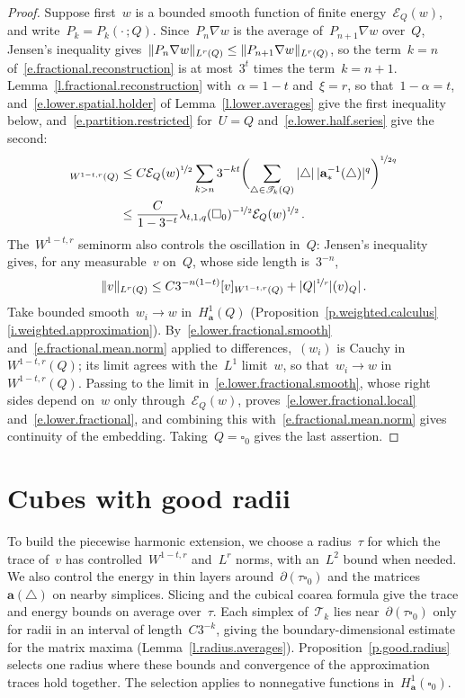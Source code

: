 \documentclass[11pt,letterpaper]{article}
\numberwithin{equation}{section}
\theoremstyle{definition}
\renewcommand{\a}{\mathbf{a}}
\newcommand{\nf}{\nicefrac}
\newcommand{\cu}{\square}
\DeclarePairedDelimiter{\norm}{\lVert}{\rVert}
\newcommand{\Ener}{\mathcal E}
\begin{document}
\begin{proof}
Suppose first~$w$ is a bounded smooth function of finite energy~$\Ener_Q(w)$, and write~$P_k=P_k(\cdot\,;Q)$. Since~$P_n\nabla w$ is the average of~$P_{n+1}\nabla w$ over~$Q$, Jensen's inequality gives~$\norm{P_n\nabla w}_{L^r(Q)}\leq\norm{P_{n+1}\nabla w}_{L^r(Q)}$, so the term~$k=n$ of~\eqref{e.fractional.reconstruction} is at most~$3^t$ times the term~$k=n+1$. Lemma~\ref{l.fractional.reconstruction} with~$\alpha=1-t$ and~$\xi=r$, so that~$1-\alpha=t$, and~\eqref{e.lower.spatial.holder} of Lemma~\ref{l.lower.averages} give the first inequality below, and~\eqref{e.partition.restricted} for~$U=Q$ and~\eqref{e.lower.half.series} give the second:
\begin{align}
	[w]_{W^{1-t,r}(Q)}&\leq C\Ener_Q(w)^{\nf12}\sum_{k>n}3^{-kt}\biggl(\sum_{\triangle\in\mathscr T_k(Q)}|\triangle|\,|\a_*^{-1}(\triangle)|^q\biggr)^{\nf1{2q}}\notag\\
	&\leq\frac{C}{1-3^{-t}}\lambda_{t,1,q}(\cu_0)^{-\nf12}\Ener_Q(w)^{\nf12}\,.
	\label{e.lower.fractional.smooth}
\end{align}
The~$W^{1-t,r}$ seminorm also controls the oscillation in~$Q$: Jensen's inequality gives, for any measurable~$v$ on~$Q$, whose side length is~$3^{-n}$,
\begin{equation}
	\norm{v}_{L^r(Q)}\leq C3^{-n(1-t)}[v]_{W^{1-t,r}(Q)}+|Q|^{\nf1r}|(v)_Q|\,.
	\label{e.fractional.mean.norm}
\end{equation}
Take bounded smooth~$w_i\to w$ in~$H^1_\a(Q)$ (Proposition~\ref{p.weighted.calculus}\ref{i.weighted.approximation}). By~\eqref{e.lower.fractional.smooth} and~\eqref{e.fractional.mean.norm} applied to differences,~$(w_i)$ is Cauchy in~$W^{1-t,r}(Q)$; its limit agrees with the~$L^1$ limit~$w$, so that~$w_i\to w$ in~$W^{1-t,r}(Q)$. Passing to the limit in~\eqref{e.lower.fractional.smooth}, whose right sides depend on~$w$ only through~$\Ener_Q(w)$, proves~\eqref{e.lower.fractional.local} and~\eqref{e.lower.fractional}, and combining this with~\eqref{e.fractional.mean.norm} gives continuity of the embedding. Taking~$Q=\cu_0$ gives the last assertion.
\end{proof}

\section{Cubes with good radii}
\label{s.good.radii}

To build the piecewise harmonic extension, we choose a radius~$\tau$ for which the trace of~$v$ has controlled~$W^{1-t,r}$ and~$L^r$ norms, with an~$L^2$ bound when needed. We also control the energy in thin layers around~$\partial(\tau\cu_0)$ and the matrices~$\a(\triangle)$ on nearby simplices. Slicing and the cubical coarea formula give the trace and energy bounds on average over~$\tau$. Each simplex of~$\mathscr T_k$ lies near~$\partial(\tau\cu_0)$ only for radii in an interval of length~$C3^{-k}$, giving the boundary-dimensional estimate for the matrix maxima (Lemma~\ref{l.radius.averages}). Proposition~\ref{p.good.radius} selects one radius where these bounds and convergence of the approximation traces hold together. The selection applies to nonnegative functions in~$H^1_\a(\cu_0)$.
\end{document}
